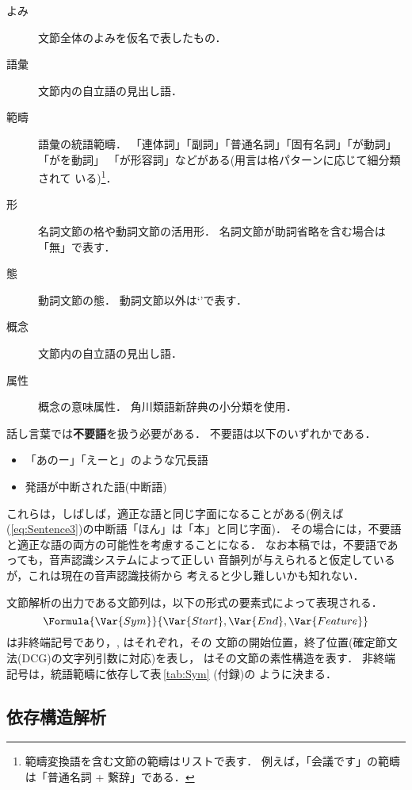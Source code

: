 \begin{description}
  \item[よみ] 文節全体のよみを仮名で表したもの．
  \item[語彙] 文節内の自立語の見出し語．
  \item[範疇] 語彙の統語範疇．
「連体詞」「副詞」「普通名詞」「固有名詞」「が動詞」「がを動詞」
「が形容詞」などがある(用言は格パターンに応じて細分類されて
いる)\footnote{
  範疇変換語を含む文節の範疇はリストで表す．
例えば，「会議です」の範疇は「普通名詞 + 繋辞」である．
}．
  \item[形] 名詞文節の格や動詞文節の活用形．
名詞文節が助詞省略を含む場合は「無」で表す．
  \item[態] 動詞文節の態．
動詞文節以外は`\Value{$-$}'で表す．
  \item[概念] 文節内の自立語の見出し語．
  \item[属性] 概念の意味属性．
角川類語新辞典\cite{大野:角類新-81}の小分類を使用．
\end{description}

話し言葉では{\bf 不要語}を扱う必要がある．
不要語は以下のいずれかである．
\begin{itemize}
  \item 「あのー」「えーと」のような冗長語
  \item 発語が中断された語(中断語)
\end{itemize}
これらは，しばしば，適正な語と同じ字面になることがある(例えば
(\ref{eq:Sentence3})の中断語「ほん」は「本」と同じ字面)．
その場合には，不要語と適正な語の両方の可能性を考慮することになる．
なお本稿では，不要語であっても，音声認識システムによって正しい
音韻列が与えられると仮定しているが，これは現在の音声認識技術から
考えると少し難しいかも知れない．

文節解析の出力である文節列は，以下の形式の要素式によって表現される．
\begin{equation}\label{eq:Bunsetsu}
  \Formula{\Var{Sym}}{\Var{Start},\Var{End},\Var{Feature}}
\end{equation}
は非終端記号であり，, はそれぞれ，その
文節の開始位置，終了位置(確定節文法(DCG)の文字列引数に対応)を表し，
はその文節の素性構造を表す．
非終端記号は，統語範疇に依存して表\,\ref{tab:Sym} (付録)の
ように決まる．

\subsection{依存構造解析}\label{sec:Uniform:Struct}

